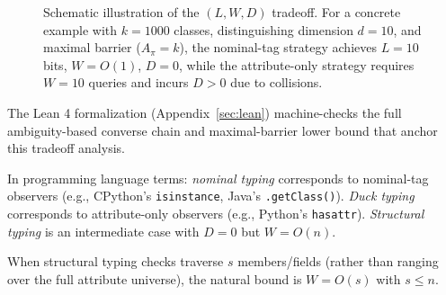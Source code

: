 \begin{figure}[t]
\centering
{}
\caption{Schematic illustration of the $(L, W, D)$ tradeoff. For a concrete example with $k = 1000$ classes, distinguishing dimension $d = 10$, and maximal barrier ($A_\pi = k$), the nominal-tag strategy achieves $L = 10$ bits, $W = O(1)$, $D = 0$, while the attribute-only strategy requires $W = 10$ queries and incurs $D > 0$ due to collisions.}
\label{fig:lwd-tradeoff}
\end{figure}

The Lean 4 formalization (Appendix~\ref{sec:lean}) machine-checks the full ambiguity-based converse chain and maximal-barrier lower bound that anchor this tradeoff analysis.

\begin{remark}
In programming language terms: \emph{nominal typing} corresponds to nominal-tag observers (e.g., CPython's \texttt{isinstance}, Java's \texttt{.getClass()}). \emph{Duck typing} corresponds to attribute-only observers (e.g., Python's \texttt{hasattr}). \emph{Structural typing} is an intermediate case with $D = 0$ but $W = O(n)$.
\end{remark}

\begin{remark}
When structural typing checks traverse $s$ members/fields (rather than ranging over the full attribute universe), the natural bound is $W = O(s)$ with $s \le n$.
\end{remark}
